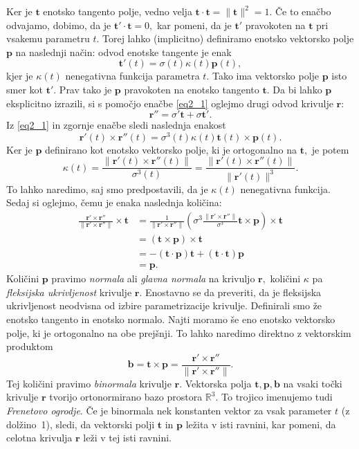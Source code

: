 \documentclass[12pt,a4paper,twoside]{article}
\theoremstyle{definition} %
\theoremstyle{plain} %
\theoremstyle{primerstyle}
\numberwithin{equation}{section}  %
\newcommand{\R}{\mathbb R}
\newcommand{\tV}{\mathbf{t}}
\newcommand{\bV}{\mathbf{b}}
\newcommand{\pV}{\mathbf{p}}
\newcommand{\rV}{\mathbf{r}}
\begin{document}
Ker je $\tV$ enotsko tangento polje, vedno velja $\tV \cdot \tV=\lVert \tV \rVert^2 =1.$ Če to enačbo odvajamo, dobimo, da je $\tV' \cdot \tV=0,$ kar pomeni, da je $\tV'$ pravokoten na $\tV$ pri vsakemu parametru $t.$ Torej lahko (implicitno) definiramo enotsko vektorsko polje $\pV$ na naslednji način: odvod enotske tangente je enak
\begin{equation}
	\label{eq2_5}
	\tV'(t)=\sigma(t)\kappa(t)\pV(t),
\end{equation}
kjer je $\kappa(t)$ nenegativna funkcija parametra $t.$ Tako ima vektorsko polje $\pV$ isto smer kot $\tV'.$ Prav tako je $\pV$ pravokoten na enotsko tangento $\tV.$ Da bi lahko $\pV$ eksplicitno izrazili, si s pomočjo enačbe \eqref{eq2_1} oglejmo drugi odvod krivulje $\rV:$
\begin{equation}
	\label{eq2_6}
	\rV''=\sigma'\tV+\sigma\tV'.
\end{equation}
Iz \eqref{eq2_1} in zgornje enačbe sledi naslednja enakost
\begin{equation}
	\label{eq2_7}
	\rV'(t) \times \rV''(t)=\sigma^3(t)\kappa(t)\tV(t) \times \pV(t).
\end{equation}
Ker je $\pV$ definirano kot enotsko vektorsko polje, ki je ortogonalno na $\tV,$ je potem
\begin{equation}
	\label{kappa1}
	\kappa(t)=\frac{\lVert \rV'(t) \times \rV''(t) \rVert}{\sigma^3(t)}=\frac{\lVert \rV'(t) \times \rV''(t) \rVert}{\lVert \rV'(t) \rVert^3}.
\end{equation}
To lahko naredimo, saj smo predpostavili, da je $\kappa(t)$ nenegativna funkcija. Sedaj si oglejmo, čemu je enaka naslednja količina:
\begin{align}
	\frac{\rV'\times \rV''}{\lVert \rV'\times \rV'' \rVert} \times \tV &= \frac{1}{\lVert \rV'\times \rV'' \rVert} \left ( \sigma^3 \frac{\lVert \rV'\times \rV'' \rVert}{\sigma^3}\tV \times \pV\right ) \times \tV \nonumber \\
	&= (\tV \times \pV) \times \tV \nonumber \\
	&= -(\tV \cdot \pV)\tV + (\tV \cdot \tV)\pV \label{normala} \\
	&= \pV. \nonumber
\end{align}
Količini $\pV$ pravimo \textit{normala} ali \textit{glavna normala} na krivuljo $\rV,$ količini $\kappa$ pa \textit{fleksijska ukrivljenost} krivulje $\rV.$ Enostavno se da preveriti, da je fleksijska ukrivljenost neodvisna od izbire parametrizacije krivulje.
Definirali smo že enotsko tangento in enotsko normalo. Najti moramo še eno enotsko vektorsko polje, ki je ortogonalno na obe prejšnji. To lahko naredimo direktno z vektorskim produktom
\begin{equation}
	\label{binormala}
	\bV=\tV \times \pV=\frac{\rV'\times \rV''}{\lVert \rV'\times \rV'' \rVert}.
\end{equation}
Tej količini pravimo \textit{binormala} krivulje $\rV.$ Vektorska polja $\tV,\mathbf{ p}, \mathbf{ b}$ na vsaki točki krivulje $\rV$ tvorijo ortonormirano bazo prostora $\R^3.$ To trojico imenujemo tudi \textit{Frenetovo ogrodje}. Če je binormala nek konstanten vektor za vsak parameter $t$ (z dolžino~1), sledi, da vektorski polji $\tV$ in $\pV$ ležita v isti ravnini, kar pomeni, da celotna krivulja $\rV$ leži v tej isti ravnini.
\end{document}
